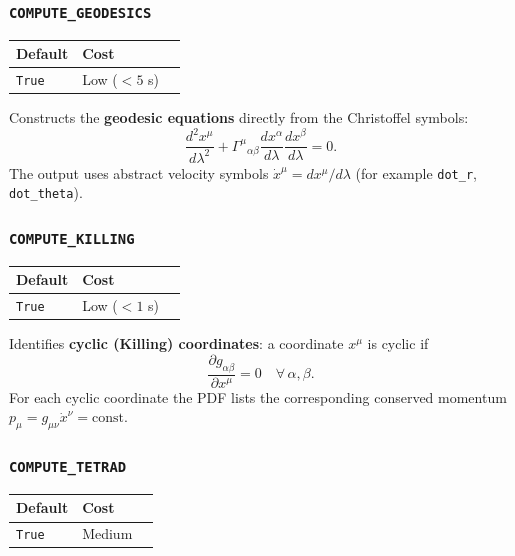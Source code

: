 \documentclass[11pt,a4paper]{article}
\newcommand{\code}[1]{\texttt{\small#1}}
\renewcommand{\Gamma}{\varGamma}
\begin{document}
\subsubsection{\code{COMPUTE\_GEODESICS}}

\begin{center}
\begin{tabular}{lll}
  \toprule
  Default & Cost & \\
  \midrule
  \code{True} & Low ($< 5$ s) & \\
  \bottomrule
\end{tabular}
\end{center}

Constructs the \textbf{geodesic equations} directly from the Christoffel
symbols:
\[
  \frac{d^2 x^\mu}{d\lambda^2}
  + \Gamma^\mu{}_{\alpha\beta}
    \frac{dx^\alpha}{d\lambda}\frac{dx^\beta}{d\lambda} = 0.
\]
The output uses abstract velocity symbols $\dot{x}^\mu = dx^\mu/d\lambda$
(for example \code{dot\_r}, \code{dot\_theta}).

\subsubsection{\code{COMPUTE\_KILLING}}

\begin{center}
\begin{tabular}{lll}
  \toprule
  Default & Cost & \\
  \midrule
  \code{True} & Low ($< 1$ s) & \\
  \bottomrule
\end{tabular}
\end{center}

Identifies \textbf{cyclic (Killing) coordinates}: a coordinate $x^\mu$ is
cyclic if
\[
  \frac{\partial g_{\alpha\beta}}{\partial x^\mu} = 0
  \quad \forall\,\alpha,\beta.
\]
For each cyclic coordinate the PDF lists the corresponding conserved
momentum $p_\mu = g_{\mu\nu}\dot{x}^\nu = \mathrm{const}$.

\subsubsection{\code{COMPUTE\_TETRAD}}

\begin{center}
\begin{tabular}{lll}
  \toprule
  Default & Cost & \\
  \midrule
  \code{True} & Medium & \\
  \bottomrule
\end{tabular}
\end{center}
\end{document}
